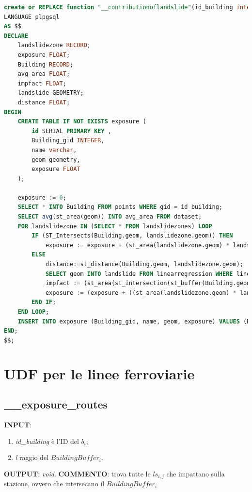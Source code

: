 \begin{lstlisting}[language=SQL]
create or REPLACE function "__contributionoflandslide"(id_building integer, l double precision) returns void
LANGUAGE plpgsql
AS $$
DECLARE
	landslidezone RECORD;
	exposure FLOAT;
	Building RECORD;
	avg_area FLOAT;
	impfact FLOAT;
	landslide GEOMETRY;
	distance FLOAT;
BEGIN
	CREATE TABLE IF NOT EXISTS exposure (
		id SERIAL PRIMARY KEY ,
		Building_gid INTEGER,
		name varchar,
		geom geometry,
		exposure FLOAT
	);

	exposure := 0;
	SELECT * INTO Building FROM points WHERE gid = id_building;
	SELECT avg(st_area(geom)) INTO avg_area FROM dataset;
	FOR landslidezone IN (SELECT * FROM landslidezones) LOOP
		IF (ST_Intersects(Building.geom, landslidezone.geom)) THEN
			exposure := exposure + (st_area(landslidezone.geom) * landslidezone.szk);
		ELSE
			distance:=st_distance(Building.geom, landslidezone.geom);
			SELECT geom INTO landslide FROM linearregression WHERE linearregression.id_zone = landslidezone.id;
			impfact := (st_area(st_intersection(st_buffer(Building.geom,l),landslide)))/(st_area(st_buffer(Building.geom,l)));
			exposure := (exposure + ((st_area(landslidezone.geom) * landslidezone.szk)*impfact));
		END IF;
	END LOOP;
	INSERT INTO exposure (Building_gid, name, geom, exposure) VALUES (Building.gid, Building.name, Building.geom, exposure/avg_area);
END;
$$;
\end{lstlisting}

\section{UDF per le linee ferroviarie}

\subsection{\_\_exposure\_routes}

\textbf{INPUT}: 
\begin{enumerate}
	\item \textit{id\_building} è l'ID del $b_i$;
	\item \textit{l} raggio del $BuildingBuffer_i$.
\end{enumerate}
\textbf{OUTPUT}: \textit{void}. \newline
\textbf{COMMENTO}: trova tutte le $ls_{i,j}$ che impattano sulla stazione, ovvero che intersecano il $BuildingBuffer_i$

